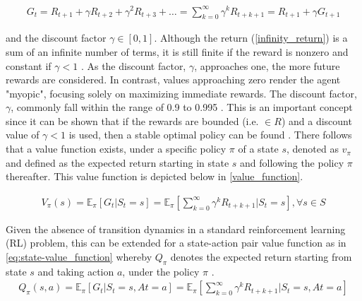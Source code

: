 \begin{equation}
	\begin{aligned}
		G_t  = R_{t+1} + \gamma R_{t+2} + \gamma^2 R_{t+3} + \dots = \sum_{k=0}^\infty \gamma^k R_{t+k+1} = R_{t+1} + \gamma G_{t+1}
	\end{aligned}
	\label{infinity_return}
\end{equation}

and the discount factor $\gamma \in [0,1]$. Although the return (\autoref{infinity_return}) is a sum of an infinite number of terms, it is still finite if the reward is nonzero and constant if $\gamma < 1$ \cite{suttonReinforcementLearningIntroduction2014}. As the discount factor, $\gamma$, approaches one, the more future rewards are considered.  In contrast, values approaching zero render the agent "myopic", focusing solely on maximizing immediate rewards. The discount factor, $\gamma$, commonly fall within the range of 0.9 to 0.995 \cite{vandenbemdRobustDeepReinforcement}. This is an important concept since it can be shown that if the rewards are bounded (i.e. $\in R$) and a discount value of $\gamma <1$ is used, then a stable optimal policy can be found \cite{bertsekasNewtonMethodReinforcement2022}. There follows that a value function exists, under a specific policy $\pi$ of a state $s$, denoted as $v_{\pi}$ and defined as the expected return starting in state $s$ and following the policy $\pi$ thereafter. This value function is depicted below in \autoref{value_function}.

\begin{equation}
	\begin{aligned}
		V_{\pi}(s) =  \mathbb{E}_{\pi}\left[{G_t | S_t = s}\right] =  \mathbb{E}_{\pi} 
		\left [\sum_{k=0}^{\infty} \gamma^k R_{t+k+1} | S_t = s \right], \forall s \in S 
	\end{aligned}
	\label{value_function}
\end{equation}

Given the absence of transition dynamics in a standard reinforcement learning (RL) problem, this can be extended for a state-action pair value function as in \autoref{eq:state-value_function} whereby $Q_{\pi}$ denotes the expected return starting from state $s$ and taking action $a$, under the policy $\pi$ \cite{ajagekarDeepReinforcementLearning2022}.
\begin{equation}
	\begin{aligned}
		Q_{\pi}(s,a) =  \mathbb{E}_{\pi}\left[{G_t | S_t = s, At = a}\right] =  \mathbb{E}_{\pi}\left[\sum_{k=0}^{\infty} \gamma^k R_{t+k+1} | S_t = s, At = a\right]
	\end{aligned}
	\label{eq:state-value_function}
\end{equation}

